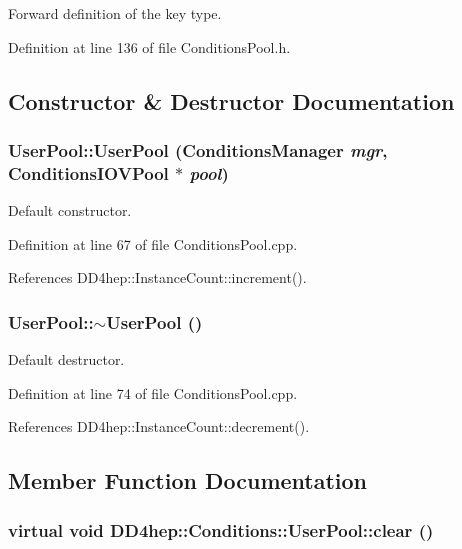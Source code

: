 Forward definition of the key type. 

Definition at line 136 of file ConditionsPool.h.

\subsection{Constructor \& Destructor Documentation}
\hypertarget{class_d_d4hep_1_1_conditions_1_1_user_pool_a70dd3921967ca613fe912e90b3139494}{
\subsubsection[{UserPool}]{\setlength{\rightskip}{0pt plus 5cm}UserPool::UserPool ({\bf ConditionsManager} {\em mgr}, \/  {\bf ConditionsIOVPool} $\ast$ {\em pool})}}
\label{class_d_d4hep_1_1_conditions_1_1_user_pool_a70dd3921967ca613fe912e90b3139494}


Default constructor. 

Definition at line 67 of file ConditionsPool.cpp.

References DD4hep::InstanceCount::increment().\hypertarget{class_d_d4hep_1_1_conditions_1_1_user_pool_abc62b1465b8e6f40a57c5a2f9819d7eb}{
\subsubsection[{$\sim$UserPool}]{\setlength{\rightskip}{0pt plus 5cm}UserPool::$\sim$UserPool ()}}
\label{class_d_d4hep_1_1_conditions_1_1_user_pool_abc62b1465b8e6f40a57c5a2f9819d7eb}


Default destructor. 

Definition at line 74 of file ConditionsPool.cpp.

References DD4hep::InstanceCount::decrement().

\subsection{Member Function Documentation}
\hypertarget{class_d_d4hep_1_1_conditions_1_1_user_pool_aa1b208b96c66bee13ee9f2bd6b7aaac5}{
\subsubsection[{clear}]{\setlength{\rightskip}{0pt plus 5cm}virtual void DD4hep::Conditions::UserPool::clear ()}}
\label{class_d_d4hep_1_1_conditions_1_1_user_pool_aa1b208b96c66bee13ee9f2bd6b7aaac5}


